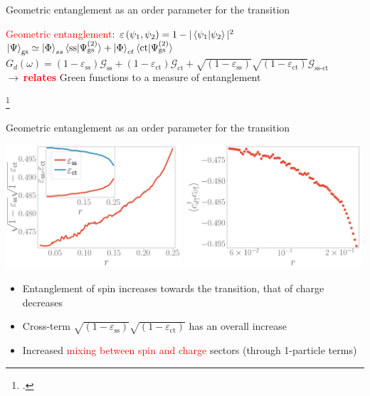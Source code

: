 \documentclass[11pt,aspectratio=169]{beamer}
\newcommand{\focus}[1]{\textcolor{red}{#1}}
\begin{document}
\begin{frame}{Geometric entanglement as an order parameter for the transition}

	\focus{Geometric entanglement}: \(\varepsilon\left(\psi_1,\psi_2\right) = 1 - |\braket{\psi_1 | \psi_2}|^2\)\\[20pt]

	\(\ket{\Psi}_\text{gs} \simeq \ket{\Phi}_{ss}\braket{\text{ss}|\Psi^{(2)}_\text{gs}} + \ket{\Phi}_{ct}\braket{\text{ct}|\Psi^{(2)}_\text{gs}}\)\\[20pt]

	\(G_d(\omega) = \left(1 - \varepsilon_\text{ss} \right) \mathcal{G}_\text{ss} + \left(1 - \varepsilon_\text{ct} \right) \mathcal{G}_\text{ct} + \sqrt{\left(1 - \varepsilon_\text{ss} \right)}\sqrt{\left(1 - \varepsilon_\text{ct} \right)} \mathcal{G}_\text{ss-ct}\)\\[20pt]

	\(\longrightarrow~\)\focus{\bf relates} Green functions to a measure of entanglement

	\footcite{shimony1995degree,wei2003geometric,horodecki2009quantum}
\end{frame}

\begin{frame}{Geometric entanglement as an order parameter for the transition}

\hspace*{-10pt}
\includegraphics[width=0.49\textwidth]{figures/entanglement.pdf}
\hspace*{\fill}
\includegraphics[width=0.49\textwidth]{figures/corr_1p.pdf}

\begin{itemize}
	\item Entanglement of spin increases towards the transition, that of charge decreases \\[10pt]
	\item Cross-term \(\sqrt{\left(1 - \varepsilon_\text{ss} \right)}\sqrt{\left(1 - \varepsilon_\text{ct} \right)}\) has an overall increase\\[10pt]
	\item Increased \focus{mixing between spin and charge} sectors (through 1-particle terms)
\end{itemize}

\end{frame}
\end{document}
